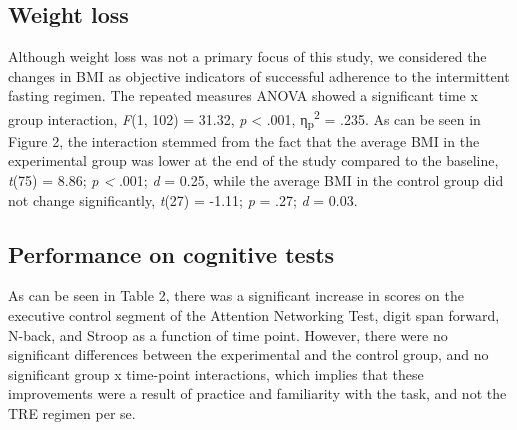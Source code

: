 \documentclass[authordate, empirical,issue]{jote-new-article}
\begin{document}
\subsection{Weight loss}



Although weight loss was not a primary focus of this study, we considered the changes in BMI as objective indicators of successful adherence to the intermittent fasting regimen. The repeated measures ANOVA showed a significant time x group interaction, \emph{F}(1, 102) = 31.32, \emph{p} < .001, η\textsubscript{p}\textsuperscript{2} = .235. As can be seen in Figure 2, the interaction stemmed from the fact that the average BMI in the experimental group was lower at the end of the study compared to the baseline, \emph{t}(75) = 8.86; \emph{p < }.001; \emph{d} = 0.25, while the average BMI in the control group did not change significantly, \emph{t}(27) = -1.11; \emph{p }= .27; \emph{d} = 0.03.








\subsection{Performance on cognitive tests}



As can be seen in Table 2, there was a significant increase in scores on the executive control segment of the Attention Networking Test, digit span forward, N-back, and Stroop as a function of time point. However, there were no significant differences between the experimental and the control group, and no significant group x time-point interactions, which implies that these improvements were a result of practice and familiarity with the task, and not the TRE regimen per se.
\end{document}
